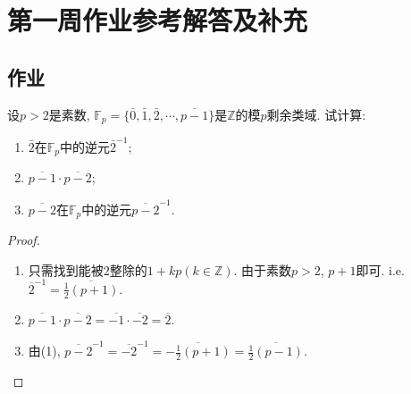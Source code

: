 \documentclass{../solutions-cn}
\begin{document}
\section*{第一周作业参考解答及补充}

\subsection*{作业}

\begin{exercise}[习题1.1.6]
    设$p > 2$是素数, $\mathbb{F}_p = \{\bar{0}, \bar{1}, \bar{2}, \cdots, \overline{p-1}\}$是$\mathbb{Z}$的模$p$剩余类域. 试计算: 
    \begin{enumerate}[(1)]
        \item $\bar{2}$在$\mathbb{F}_p$中的逆元$\bar{2}^{-1}$;
        \item $\overline{p - 1} \cdot \overline{p - 2}$;
        \item $\overline{p - 2}$在$\mathbb{F}_p$中的逆元$\overline{p-2}^{-1}$.
    \end{enumerate}
\end{exercise}

\begin{proof}
\begin{enumerate}[(1)]
    \item 只需找到能被$2$整除的$1 + kp(k \in \mathbb{Z})$. 由于素数$p > 2$, $p + 1$即可. i.e. $\overline{2}^{-1} = \overline{\frac12(p + 1)}$.
    \item $\overline{p - 1} \cdot \overline{p - 2} = \overline{-1} \cdot \overline{-2} = \overline{2}$.
    \item 由(1), $\overline{p - 2}^{-1} = \overline{-2}^{-1} = \overline{-\frac12(p + 1)} = \overline{\frac12(p - 1)}$.
\end{enumerate}
\end{proof}
\end{document}
